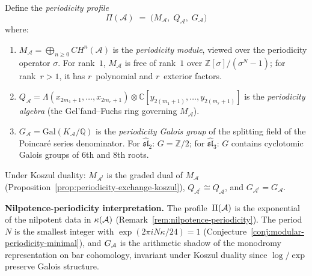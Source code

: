 \begin{remark}\label{rem:periodicity-triple}
Define the \emph{periodicity profile}
\[
\Pi(\mathcal{A}) \;=\; \bigl(M_{\mathcal{A}},\; Q_{\mathcal{A}},\;
G_{\mathcal{A}}\bigr)
\]
where:
\begin{enumerate}[label=\textup{(\roman*)}]
\item $M_{\mathcal{A}} = \bigoplus_{n \geq 0} CH^n(\mathcal{A})$ is the \emph{periodicity module}, viewed over the periodicity operator $\sigma$.  For rank~$1$, $M_{\mathcal{A}}$ is free of rank~$1$ over $\mathbb{Z}[\sigma]/(\sigma^N - 1)$; for rank~$r > 1$, it has $r$~polynomial and $r$~exterior factors.
\item $Q_{\mathcal{A}} = \Lambda(x_{2m_1+1}, \ldots, x_{2m_r+1}) \otimes \mathbb{C}[y_{2(m_1+1)}, \ldots, y_{2(m_r+1)}]$ is the \emph{periodicity algebra} (the Gel'fand--Fuchs ring governing $M_{\mathcal{A}}$).
\item $G_{\mathcal{A}} = \mathrm{Gal}(K_{\mathcal{A}}/\mathbb{Q})$ is the \emph{periodicity Galois group} of the splitting field of the Poincar\'e series denominator.  For $\widehat{\mathfrak{sl}}_2$: $G = \mathbb{Z}/2$; for $\widehat{\mathfrak{sl}}_3$: $G$ contains cyclotomic Galois groups of $6$th and $8$th roots.
\end{enumerate}
Under Koszul duality: $M_{\mathcal{A}^!}$ is the graded dual of $M_{\mathcal{A}}$ (Proposition~\ref{prop:periodicity-exchange-koszul}), $Q_{\mathcal{A}^!} \cong Q_{\mathcal{A}}$, and $G_{\mathcal{A}^!} = G_{\mathcal{A}}$.

\textbf{Nilpotence-periodicity interpretation.}
The profile~$\Pi(\mathcal{A})$ is the exponential of the nilpotent data in $\kappa(\mathcal{A})$ (Remark~\ref{rem:nilpotence-periodicity}).  The period~$N$ is the smallest integer with $\exp(2\pi i N \kappa/24) = 1$ (Conjecture~\ref{conj:modular-periodicity-minimal}), and $G_{\mathcal{A}}$ is the arithmetic shadow of the monodromy representation on bar cohomology, invariant under Koszul duality since $\log/\exp$ preserve Galois structure.
\end{remark}

